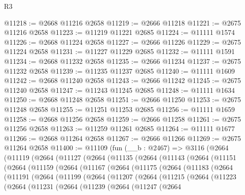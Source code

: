 \begin{lexlean}{R3}
\begin{coremodule}
@11218 := @2668 @11216 @2658
@11219 := @2666 @11218
@11221 := @2675 @11216 @2658
@11223 := @11219 @11221 @2685
@11224 := @11111 @1574
@11226 := @2668 @11224 @2658
@11227 := @2666 @11226
@11229 := @2675 @11224 @2658
@11231 := @11227 @11229 @2685
@11232 := @11111 @1591
@11234 := @2668 @11232 @2658
@11235 := @2666 @11234
@11237 := @2675 @11232 @2658
@11239 := @11235 @11237 @2685
@11240 := @11111 @1609
@11242 := @2668 @11240 @2658
@11243 := @2666 @11242
@11245 := @2675 @11240 @2658
@11247 := @11243 @11245 @2685
@11248 := @11111 @1634
@11250 := @2668 @11248 @2658
@11251 := @2666 @11250
@11253 := @2675 @11248 @2658
@11255 := @11251 @11253 @2685
@11256 := @11111 @1659
@11258 := @2668 @11256 @2658
@11259 := @2666 @11258
@11261 := @2675 @11256 @2658
@11263 := @11259 @11261 @2685
@11264 := @11111 @1677
@11266 := @2668 @11264 @2658
@11267 := @2666 @11266
@11269 := @2675 @11264 @2658
@11400 := @11109
    (fun (__b : @2467) =>
    @3116
      (@2664
        (@11119
          (@2664
            (@11127
              (@2664
                (@11135
                  (@2664
                    (@11143
                      (@2664
                        (@11151
                          (@2664
                            (@11159
                              (@2664
                                (@11167
                                  (@2664
                                    (@11175
                                      (@2664
                                        (@11183
                                          (@2664
                                            (@11191
                                              (@2664
                                                (@11199
                                                  (@2664
                                                    (@11207
                                                      (@2664
                                                        (@11215
                                                          (@2664
                                                            (@11223
                                                              (@2664
                                                                (@11231
                                                                  (@2664
                                                                    (@11239
                                                                      (@2664
                                                                        (@11247
                                                                          (@2664

\end{coremodule}
\end{lexlean}
